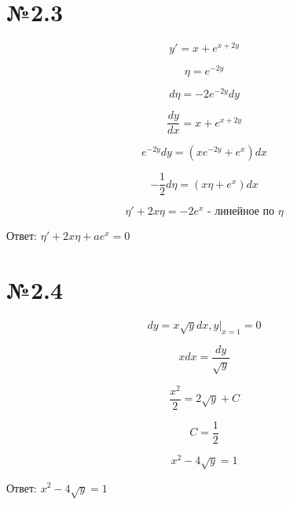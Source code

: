 \documentclass{article}
\begin{document}
\section*{№2.3}

\begin{equation*}
    y' = x + e^{x + 2y}
\end{equation*}

\begin{equation*}
   \eta = e^{-2y} 
\end{equation*}

\begin{equation*}
    d\eta = -2e^{-2y}dy
\end{equation*}

\begin{equation*}
    \frac{dy}{dx} = x + e^{x + 2y}
\end{equation*}

\begin{equation*}
    e^{-2y}dy = (xe^{-2y} + e^x)dx
\end{equation*}

\begin{equation*}
    -\frac{1}{2}d\eta = (x\eta + e^x)dx
\end{equation*}

\begin{equation*}
    \eta' + 2x\eta = -2e^x \text{ - линейное по } \eta
\end{equation*}

Ответ: $\eta' + 2x\eta + ae^x = 0$

\section*{№2.4}

\begin{equation*}
    dy = x\sqrt{y} dx,y|_{x=1} = 0
\end{equation*}

\begin{equation*}
    xdx = \frac{dy}{\sqrt{y}}
\end{equation*}

\begin{equation*}
    \frac{x^2}{2} = 2\sqrt{y} + C
\end{equation*}

\begin{equation*}
    C = \frac{1}{2}
\end{equation*}

\begin{equation*}
    x^2 - 4\sqrt{y} = 1
\end{equation*}

Ответ: $x^2 - 4\sqrt{y} = 1$
\end{document}
